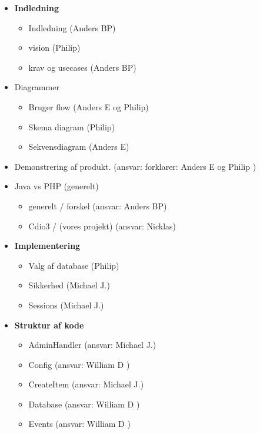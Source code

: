 \documentclass[12pt,a4paper]{report} %
\begin{document}
    \begin{itemize}
        \item \textbf{Indledning}
        \begin{itemize}
                \item Indledning (Anders BP)
                \item vision (Philip)
                \item krav og usecases (Anders BP)
             \end{itemize} 
        \item Diagrammer
        \begin{itemize}
                \item Bruger flow (Anders E og Philip)
                \item Skema diagram (Philip)
                \item Sekvensdiagram (Anders E)
             \end{itemize} 
        \item Demonstrering af produkt. (ansvar: forklarer: Anders E og Philip ) 
        \item  Java vs PHP (generelt)
        \begin{itemize}
                \item generelt / forskel (ansvar: Anders BP)
                \item Cdio3  / (vores projekt) (ansvar: Nicklas)
             \end{itemize}
        \item \textbf{Implementering}
            \begin{itemize}
                \item Valg af database (Philip)
                \item Sikkerhed (Michael J.)
                \item Sessions (Michael J.)
             \end{itemize}
        \item \textbf{ Struktur af kode} 
            \begin{itemize}
                \item AdminHandler (ansvar: Michael J.)
                \item Config (ansvar: William D ) 
                \item CreateItem (ansvar: Michael J.)
                \item Database (ansvar: William D ) 
                \item Events (ansvar: William D ) 

\end{itemize}
\end{itemize}
\end{document}
